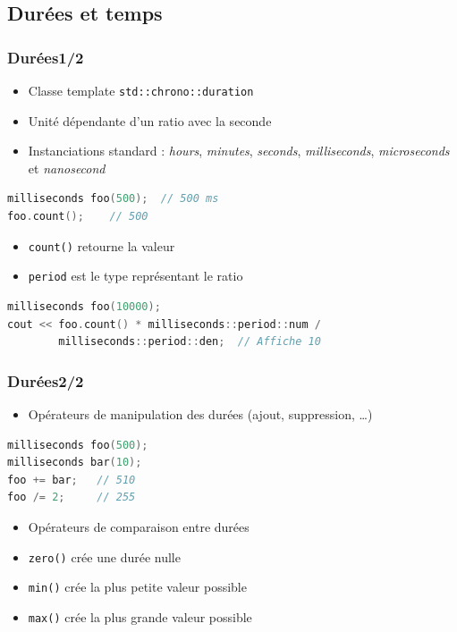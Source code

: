 \documentclass[C++.tex]{subfiles}
\begin{document}
\subsection*{Durées et temps}
\begin{frame}[fragile]
	\frametitle{Durées\titlehfill{}1/2}
	\begin{itemize}
		\item Classe template \lstinline|std::chrono::duration|
		\item Unité dépendante d'un ratio avec la seconde
		\item Instanciations standard : \textit{hours}, \textit{minutes}, \textit{seconds}, \textit{milliseconds}, \textit{microseconds} et \textit{nanosecond}
	\end{itemize}

	\begin{lstlisting}[language=C++]
milliseconds foo(500);  // 500 ms
foo.count();    // 500\end{lstlisting}

	\begin{itemize}
		\item \lstinline|count()| retourne la valeur
		\item \lstinline|period| est le type représentant le ratio
	\end{itemize}

	\begin{lstlisting}[language=C++]
milliseconds foo(10000);
cout << foo.count() * milliseconds::period::num / 
        milliseconds::period::den;  // Affiche 10\end{lstlisting}
\end{frame}

\begin{frame}[fragile]
	\frametitle{Durées\titlehfill{}2/2}
	\begin{itemize}
		\item Opérateurs de manipulation des durées (ajout, suppression, \ldots{})
	\end{itemize}

	\begin{lstlisting}[language=C++]
milliseconds foo(500);
milliseconds bar(10);
foo += bar;   // 510
foo /= 2;     // 255\end{lstlisting}

	\begin{itemize}
		\item Opérateurs de comparaison entre durées
		\item \lstinline|zero()| crée une durée nulle
		\item \lstinline|min()| crée la plus petite valeur possible
		\item \lstinline|max()| crée la plus grande valeur possible
	\end{itemize}
\end{frame}
\end{document}
